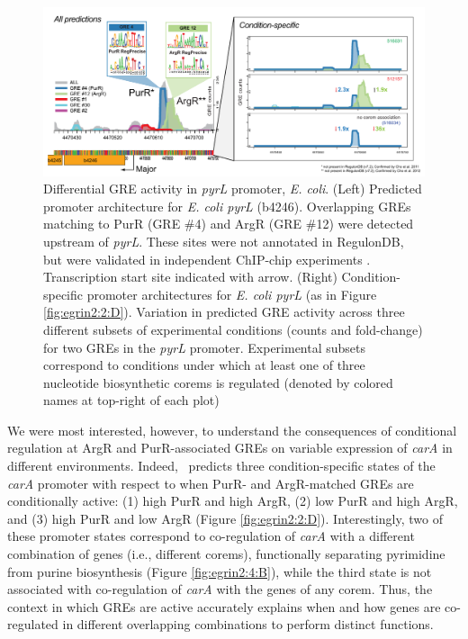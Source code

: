 \begin{figure}[h!]
    \centering
    \includegraphics[width=\textwidth]{figures/pyrL}
 	\caption[\egrine~Model Validation: Regulatory elements of \textit{pyrL}, \eco]{Differential GRE activity in \textit{pyrL} promoter, \textit{E. coli}. (Left) Predicted promoter architecture for \textit{E. coli pyrL} (b4246). Overlapping GREs matching to PurR (GRE \#4) and ArgR (GRE \#12) were detected upstream of \textit{pyrL}. These sites were not annotated in RegulonDB, but were validated in independent ChIP-chip experiments \cite{cho_purr_2011,cho_deciphering_2012}. Transcription start site indicated with arrow. (Right) Condition-specific promoter architectures for \textit{E. coli pyrL} (as in Figure \ref{fig:egrin2:2:D}). Variation in predicted GRE activity across three different subsets of experimental conditions (counts and fold-change) for two GREs in the \textit{pyrL} promoter. Experimental subsets correspond to conditions under which at least one of three nucleotide biosynthetic corems is regulated (denoted by colored names at top-right of each plot)
}
    \label{fig:pyrL}
\end{figure}

We were most interested, however, to understand the consequences of conditional regulation at ArgR and PurR-associated GREs on variable expression of \textit{carA} in different environments. Indeed, \egrine~predicts three condition-specific states of the \textit{carA} promoter with respect to when PurR- and ArgR-matched GREs are conditionally active: (1) high PurR and high ArgR, (2) low PurR and high ArgR, and (3) high PurR and low ArgR (Figure \ref{fig:egrin2:2:D}). Interestingly, two of these promoter states correspond to co-regulation of \textit{carA} with a different combination of genes (i.e., different corems), functionally separating pyrimidine from purine biosynthesis (Figure \ref{fig:egrin2:4:B}), while the third state is not associated with co-regulation of \textit{carA} with the genes of any corem. Thus, the context in which GREs are active accurately explains when and how genes are co-regulated in different overlapping combinations to perform distinct functions.

